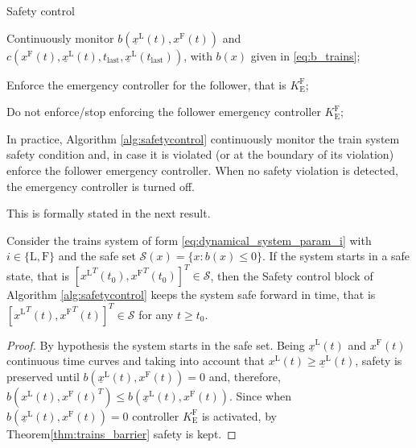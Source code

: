 \begin{algorithm}
	\caption{Safety control}\label{alg:safetycontrol}
	\begin{algorithmic}[1]
		\Loop
		
		\State Continuously monitor $b({\underline{x}^\mathrm{L}} (t),{x^\mathrm{F}}(t))$ and $c(x^\mathrm{F}(t),\underline{x}^\mathrm{L}(t),t_{\mathrm{last}},\underline{x}^\mathrm{L}(t_{\mathrm{last}}))$, with $b(x)$ given in \eqref{eq:b_trains};
		
		
		\State Enforce the emergency controller for the follower, that is $K_\mathrm{E}^\mathrm{F}$;
		
		\Else  
		
		Do not enforce/stop enforcing the follower emergency controller $K_\mathrm{E}^\mathrm{F}$;
		
		\EndIf
		
		
		\EndLoop
		
	\end{algorithmic}
\end{algorithm}


In practice, Algorithm \ref{alg:safetycontrol} continuously monitor the train system safety condition and, in case it is violated (or at the boundary of its violation) enforce the follower emergency controller. When no safety violation is detected, the emergency controller is turned off. 

This is formally stated in the next result. 


\begin{theorem}\label{thm:safetycontrol} 
	Consider the trains system of form \eqref{eq:dynamical_system_param_i} with $i\in\{\mathrm{L},\mathrm{F}\}$ and the safe set $\mathcal{S}(x)=\{x: b(x)\leq 0\}$. 
	If the system starts in a safe state, that is $[{x^\mathrm{L}}^T(t_0),{x^\mathrm{F}}^T(t_0)]^T\in\mathcal{S}$, then the Safety control block of Algorithm \ref{alg:safetycontrol} keeps the system safe forward in time, that is $[{x^\mathrm{L}}^T(t),{x^\mathrm{F}}^T(t)]^T\in\mathcal{S}$ for any $t\geq t_0$.
	\begin{proof}
		By hypothesis the system starts in the safe set. Being $\underline{x}^\mathrm{L}(t)$ and ${x^\mathrm{F}}(t)$ continuous time curves and taking into account that $x^\mathrm{L}(t)\geq  \underline{x}^\mathrm{L}(t)$, safety is preserved until $b({\underline{x}^\mathrm{L}}(t),{x^\mathrm{F}}(t))=0$ and, therefore,  $b({x^\mathrm{L}}(t),{x^\mathrm{F}}(t)^T)\leq b({\underline{x}^\mathrm{L}}(t),{x^\mathrm{F}}(t))$. Since when $b({\underline{x}^\mathrm{L}}(t),{x^\mathrm{F}}(t))=0$ controller $K_\mathrm{E}^\mathrm{F}$ is activated, by Theorem\tildeAdd\ref{thm:trains_barrier} safety is kept. 
	\end{proof}
\end{theorem}

